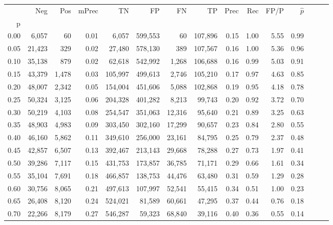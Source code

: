 \begin{tabular}{rrrrrrrrrrrrrrr}
\toprule
{} &     Neg &    Pos & mPrec &       TN &       FP &       FN &       TP &  Prec &   Rec &  FP/P & $\hat{p}$ \\
p    &         &        &       &          &          &          &          &       &       &       &           \\
\midrule
0.00 &   6,057 &     60 &  0.01 &    6,057 &  599,553 &       60 &  107,896 &  0.15 &  1.00 &  5.55 &      0.99 \\
0.05 &  21,423 &    329 &  0.02 &   27,480 &  578,130 &      389 &  107,567 &  0.16 &  1.00 &  5.36 &      0.96 \\
0.10 &  35,138 &    879 &  0.02 &   62,618 &  542,992 &    1,268 &  106,688 &  0.16 &  0.99 &  5.03 &      0.91 \\
0.15 &  43,379 &  1,478 &  0.03 &  105,997 &  499,613 &    2,746 &  105,210 &  0.17 &  0.97 &  4.63 &      0.85 \\
0.20 &  48,007 &  2,342 &  0.05 &  154,004 &  451,606 &    5,088 &  102,868 &  0.19 &  0.95 &  4.18 &      0.78 \\
0.25 &  50,324 &  3,125 &  0.06 &  204,328 &  401,282 &    8,213 &   99,743 &  0.20 &  0.92 &  3.72 &      0.70 \\
0.30 &  50,219 &  4,103 &  0.08 &  254,547 &  351,063 &   12,316 &   95,640 &  0.21 &  0.89 &  3.25 &      0.63 \\
0.35 &  48,903 &  4,983 &  0.09 &  303,450 &  302,160 &   17,299 &   90,657 &  0.23 &  0.84 &  2.80 &      0.55 \\
0.40 &  46,160 &  5,862 &  0.11 &  349,610 &  256,000 &   23,161 &   84,795 &  0.25 &  0.79 &  2.37 &      0.48 \\
0.45 &  42,857 &  6,507 &  0.13 &  392,467 &  213,143 &   29,668 &   78,288 &  0.27 &  0.73 &  1.97 &      0.41 \\
0.50 &  39,286 &  7,117 &  0.15 &  431,753 &  173,857 &   36,785 &   71,171 &  0.29 &  0.66 &  1.61 &      0.34 \\
0.55 &  35,104 &  7,691 &  0.18 &  466,857 &  138,753 &   44,476 &   63,480 &  0.31 &  0.59 &  1.29 &      0.28 \\
0.60 &  30,756 &  8,065 &  0.21 &  497,613 &  107,997 &   52,541 &   55,415 &  0.34 &  0.51 &  1.00 &      0.23 \\
0.65 &  26,408 &  8,120 &  0.24 &  524,021 &   81,589 &   60,661 &   47,295 &  0.37 &  0.44 &  0.76 &      0.18 \\
0.70 &  22,266 &  8,179 &  0.27 &  546,287 &   59,323 &   68,840 &   39,116 &  0.40 &  0.36 &  0.55 &      0.14 \\

\end{tabular}
